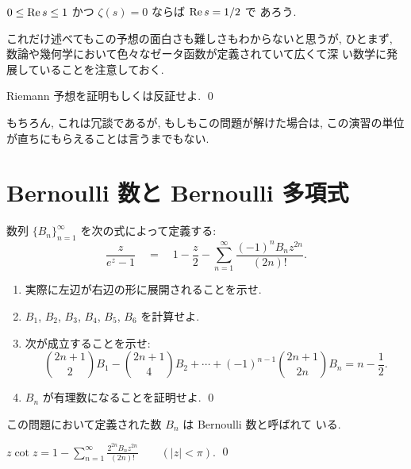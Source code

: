 \documentclass[12pt,twoside]{jarticle}
\begin{document}
\begin{Conjecture}[Riemann]\label{Riemann-Hypothesis}
  $0\le \mathop{\mathrm{Re}}\nolimits s \le 1$ かつ $\zeta(s)=0$ ならば $\mathop{\mathrm{Re}}\nolimits s = 1/2$ で
  あろう.
\end{Conjecture}

\noindent これだけ述べてもこの予想の面白さも難しさもわからないと思うが, 
ひとまず, 数論や幾何学において色々なゼータ函数が定義されていて広くて深
い数学に発展していることを注意しておく.

\begin{question}
  Riemann 予想を証明もしくは反証せよ. \qed
\end{question}

\noindent もちろん, これは冗談であるが, もしもこの問題が解けた場合は, 
この演習の単位が直ちにもらえることは言うまでもない. 


\section{Bernoulli 数と Bernoulli 多項式}

\begin{question}[Bernoulli 数]\qstar{*}
  数列 $\{B_n\}_{n=1}^{\infty}$ を次の式によって定義する:
  \[
    \frac{z}{e^z - 1}
    \quad = \quad 
    1 - \frac{z}{2} - \sum_{n=1}^{\infty}\frac{(-1)^n B_n z^{2n}}{(2n)!}.
  \]
  \begin{enumerate}
  \item 実際に左辺が右辺の形に展開されることを示せ. 
  \item $B_1$, $B_2$, $B_3$, $B_4$, $B_5$, $B_6$ を計算せよ.
  \item 次が成立することを示せ:
  \[
      {2n + 1 \choose 2} B_1
    - {2n + 1 \choose 4} B_2
    + \cdots 
    + (-1)^{n-1} {2n + 1 \choose 2n} B_n
    = n - \frac{1}{2}.
  \]
  \item $B_n$ が有理数になることを証明せよ.
    \qed
  \end{enumerate}
\end{question}

\noindent この問題において定義された数 $B_n$ は Bernoulli 数と呼ばれて
いる.

\begin{question}\label{q:zcotz1}\qstar{*}
  \(
    \displaystyle
    z \cot z
    = 1 - \sum_{n=1}^\infty \frac{2^{2n}B_nz^{2n}}{(2n)!}
    \qquad (|z| < \pi).
  \)
  \qed
\end{question}
\end{document}
